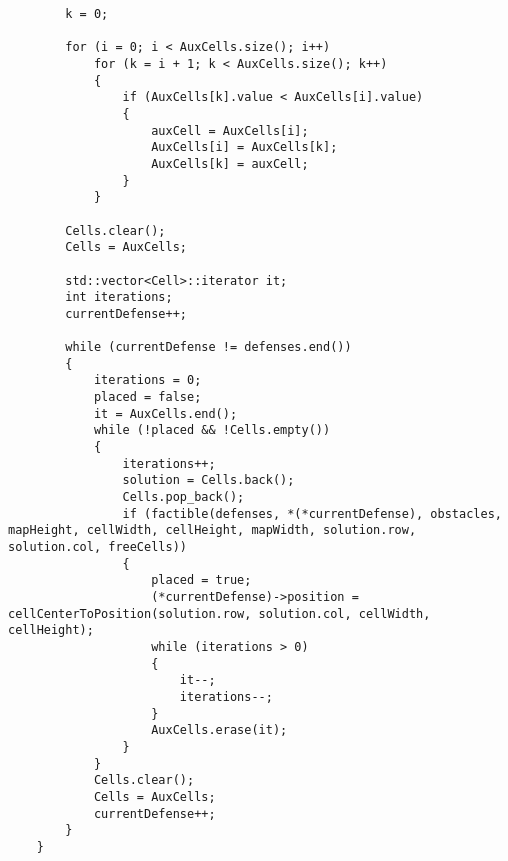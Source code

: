 \begin{lstlisting}
        k = 0;
    
        for (i = 0; i < AuxCells.size(); i++)
            for (k = i + 1; k < AuxCells.size(); k++)
            {
                if (AuxCells[k].value < AuxCells[i].value)
                {
                    auxCell = AuxCells[i];
                    AuxCells[i] = AuxCells[k];
                    AuxCells[k] = auxCell;
                }
            }
    
        Cells.clear();
        Cells = AuxCells;
    
        std::vector<Cell>::iterator it;
        int iterations;
        currentDefense++;
    
        while (currentDefense != defenses.end())
        {
            iterations = 0;
            placed = false;
            it = AuxCells.end();
            while (!placed && !Cells.empty())
            {
                iterations++;
                solution = Cells.back();
                Cells.pop_back();
                if (factible(defenses, *(*currentDefense), obstacles, mapHeight, cellWidth, cellHeight, mapWidth, solution.row, solution.col, freeCells))
                {
                    placed = true;
                    (*currentDefense)->position = cellCenterToPosition(solution.row, solution.col, cellWidth, cellHeight);
                    while (iterations > 0)
                    {
                        it--;
                        iterations--;
                    }
                    AuxCells.erase(it);
                }
            }
            Cells.clear();
            Cells = AuxCells;
            currentDefense++;
        }
    }
\end{lstlisting}